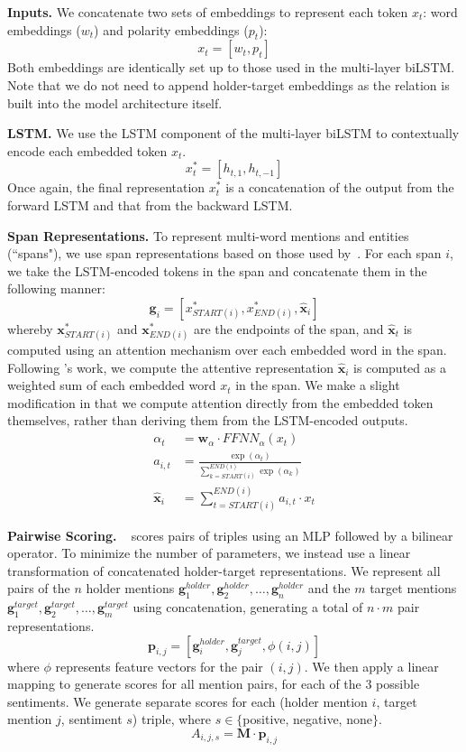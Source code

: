 \documentclass[11pt,a4paper]{article}
\begin{document}
\noindent\textbf{Inputs.}
We concatenate two sets of embeddings to represent each token $x_t$: word embeddings ($w_t$) and polarity embeddings ($p_t$):
	$$x_t = [w_t, p_t]$$
Both embeddings are identically set up to those used in the multi-layer biLSTM.
Note that we do not need to append holder-target embeddings as the relation is built into the model architecture itself.

\noindent\textbf{LSTM.}
We use the LSTM component of the multi-layer biLSTM to contextually encode each embedded token $x_t$.
	$$x^*_t = [h_{t, 1}, h_{t, -1}]$$
Once again, the final representation $x^*_t$ is a concatenation of the output from the forward LSTM and that from the backward LSTM.

\noindent\textbf{Span Representations.}
To represent multi-word mentions and entities (``spans"), we use span representations based on those used by~.
For each span $i$, we take the LSTM-encoded tokens in the span and concatenate them in the following manner:
\begin{equation*}
\textbf{g}_i = [x^*_{START(i)}, x^*_{END(i)}, \hat{\textbf{x}}_i]
\end{equation*}
whereby $\textbf{x}^*_{START(i)}$ and $\textbf{x}^*_{END(i)}$ are the endpoints of the span, and $\hat{\textbf{x}}_t$ is computed using an attention mechanism over each embedded word in the span.
Following \cite{Lee:17}'s work, we compute the attentive representation $\hat{\textbf{x}}_i$ is computed as a weighted sum of each embedded word $x_t$ in the span.
We make a slight modification in that we compute attention directly from the embedded token themselves, rather than deriving them from the LSTM-encoded outputs.
\begin{align*}
	\alpha_t & = \textbf{w}_\alpha \cdot FFNN_\alpha (x_t) \\
	a_{i, t} & = \frac{\exp{(\alpha_t)}}{\sum^{END(i)}_{k=START(i)} \exp{(\alpha_k)}} \\
	\hat{\textbf{x}}_i & = \sum^{END(i)}_{t = START(i)} a_{i, t}\cdot x_t
\end{align*}

\noindent\textbf{Pairwise Scoring.}
~ scores pairs of triples using an MLP followed by a bilinear operator.
To minimize the number of parameters, we instead use a linear transformation of concatenated holder-target representations. 
We represent all pairs of the $n$ holder mentions $\textbf{g}_{1}^{holder}, \textbf{g}_{2}^{holder},\dots,\textbf{g}_{n}^{holder}$ and the $m$ target mentions $\textbf{g}_{1}^{target}, \textbf{g}_{2}^{target},\dots,\textbf{g}_{m}^{target}$ using concatenation, generating a total of $n\cdot m$ pair representations.
	$$\textbf{p}_{i, j} = [\textbf{g}_i^{holder}, \textbf{g}_j^{target}, \phi(i, j)]$$
where $\phi$ represents feature vectors for the pair $(i, j)$.
We then apply a linear mapping to generate scores for all mention pairs, for each of the 3 possible sentiments. We generate separate scores for each (holder mention $i$, target mention $j$, sentiment $s$) triple, where $s\in\{$positive, negative, none$\}$.
	$$A_{i, j, s} = \textbf{M}\cdot \textbf{p}_{i,j}$$
\end{document}

